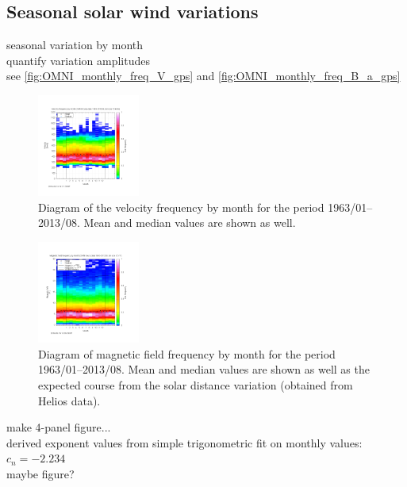 \subsection{Seasonal solar wind variations}
seasonal variation by month\\
quantify variation amplitudes\\

see \autoref{fig:OMNI_monthly_freq_V_gps} and \autoref{fig:OMNI_monthly_freq_B_a_gps}\\
\begin{figure}[htb]
	\centering
	\includegraphics[width=0.3\textwidth]{figures_of_mine/gnuplots/OMNI_monthly_freq_V_gps.png}
	\caption{Diagram of the velocity frequency by month for the period 1963/01--2013/08. Mean and median values are shown as well.}
	\label{fig:OMNI_monthly_freq_V_gps}
\end{figure}
\begin{figure}[htb]
	\centering
	\includegraphics[width=0.3\textwidth]{figures_of_mine/gnuplots/OMNI_monthly_freq_B_a_gps.png}
	\caption{Diagram of magnetic field frequency by month for the period 1963/01--2013/08. Mean and median values are shown as well as the expected course from the solar distance variation (obtained from Helios data).}
	\label{fig:OMNI_monthly_freq_B_a_gps}
\end{figure}
make 4-panel figure...\\

derived exponent values from simple trigonometric fit on monthly values:\\
$c_n = -2.234$\\
maybe figure?\\

